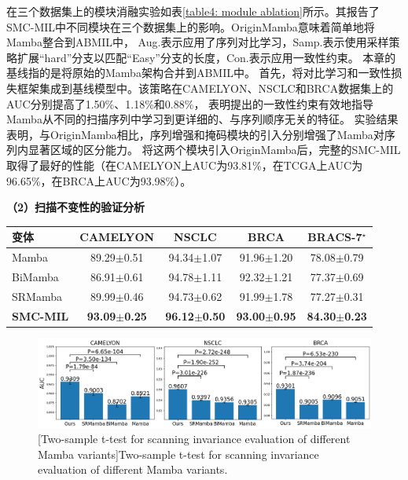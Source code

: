 在三个数据集上的模块消融实验如表\ref{table4: module ablation}所示。其报告了SMC-MIL中不同模块在三个数据集上的影响。OriginMamba意味着简单地将Mamba整合到ABMIL中，
Aug.表示应用了序列对比学习，Samp.表示使用采样策略扩展“hard”分支以匹配“Easy”分支的长度，Con.表示应用一致性约束。
本章的基线指的是将原始的Mamba架构合并到ABMIL中。
首先，将对比学习和一致性损失框架集成到基线模型中。该策略在CAMELYON、NSCLC和BRCA数据集上的AUC分别提高了1.50\%、1.18\%和0.88\%，
表明提出的一致性约束有效地指导Mamba从不同的扫描序列中学习到更详细的、与序列顺序无关的特征。
实验结果表明，与OriginMamba相比，序列增强和掩码模块的引入分别增强了Mamba对序列内显著区域的区分能力。
将这两个模块引入OriginMamba后，完整的SMC-MIL取得了最好的性能（在CAMELYON上AUC为93.81\%，在TCGA上AUC为96.65\%，在BRCA上AUC为93.98\%）。

\textbf{（2）扫描不变性的验证分析}

\begin{table}[h!]
  \large    %
  \centering
  \begin{tabularx}{\textwidth}{lCCCC}
    \toprule
    变体 & CAMELYON& NSCLC&BRCA& BRACS-7$^\star$\\ \midrule
Mamba &  89.29$\pm$0.51& 94.34$\pm$1.07 & 91.96$\pm$1.20& 78.08$\pm$0.79 \\
BiMamba  & 86.91$\pm$0.61&  94.78$\pm$1.11 & 92.32$\pm$1.21&77.37$\pm$0.69 \\
SRMamba  & 89.99$\pm$0.46& 94.73$\pm$0.62 &91.99$\pm$1.78& 77.27$\pm$0.31\\
\textbf{SMC-MIL} &\textbf{93.09$\pm$0.25}&\textbf{96.12$\pm$0.50}  &\textbf{93.00$\pm$0.95}&\textbf{84.30$\pm$0.23}\\
    \bottomrule
  \end{tabularx}
  \label{table4: scan-invariant}
\end{table}

\begin{figure}[h!]
  \centering
  \includegraphics[width=1.0\columnwidth]{figures/scan_invariant.png}
  [Two-sample t-test for scanning invariance evaluation of different Mamba variants]{Two-sample t-test for scanning invariance evaluation of different Mamba variants.}
  \label{figure4: scan-invariant}
\end{figure}

